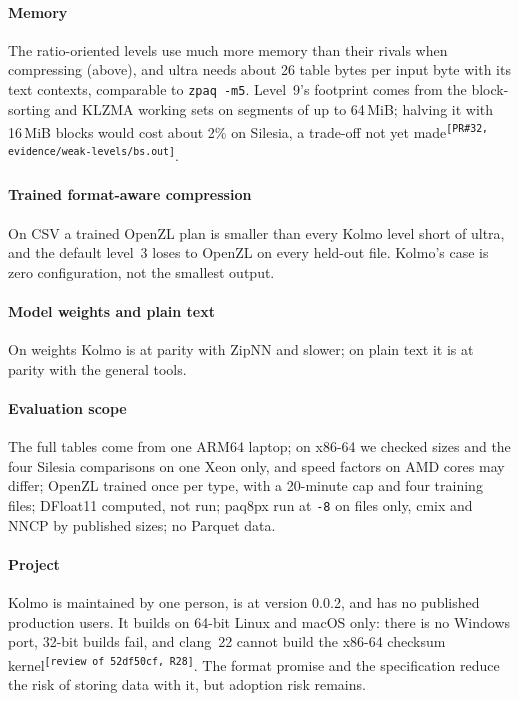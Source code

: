 \documentclass[conference]{IEEEtran}
\newcommand{\src}[1]{\textsuperscript{\tiny\color{gray}\texttt{[#1]}}}
\newcommand{\src}[1]{}
\begin{document}
\paragraph*{Memory} The ratio-oriented levels use much more memory than their rivals when compressing (above), and
ultra needs about 26 table bytes per input byte with its text contexts, comparable to \texttt{zpaq -m5}. Level~9's
footprint comes from the block-sorting and KLZMA working sets on segments of up to 64\,MiB; halving it with
16\,MiB blocks would cost about 2\% on Silesia, a trade-off not yet made\src{PR\#32, evidence/weak-levels/bs.out}.

\paragraph*{Trained format-aware compression} On CSV a trained OpenZL plan is smaller than every Kolmo level short
of ultra, and the default level~3 loses to OpenZL on every held-out file. Kolmo's case is zero configuration, not the smallest output.

\paragraph*{Model weights and plain text} On weights Kolmo is at parity with ZipNN and slower; on plain text it is
at parity with the general tools.

\paragraph*{Evaluation scope} The full tables come from one ARM64 laptop; on x86-64 we checked sizes and the four
Silesia comparisons on one Xeon only, and speed factors on AMD cores may differ; OpenZL trained once per type,
with a 20-minute cap and four training files; DFloat11 computed, not run; paq8px run at \texttt{-8} on \numArcPaqFiles{} files only, cmix and
NNCP by published sizes; no Parquet data.

\paragraph*{Project} Kolmo is maintained by one person, is at version 0.0.2, and has no published production users.
It builds on 64-bit Linux and macOS only: there is no Windows port, 32-bit builds fail, and clang~22 cannot build
the x86-64 checksum kernel\src{review of 52df50cf, R28}.
The format promise and the specification reduce the risk of storing data with it, but adoption risk remains.
\end{document}

